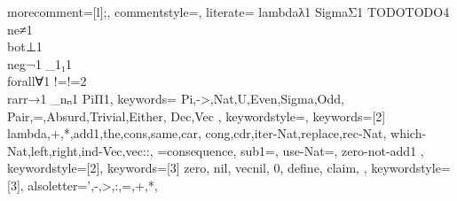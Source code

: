 
\makeatletter
\newenvironment{CenteredBox}{%
\begin{Sbox}}{%
\end{Sbox}\centerline{\parbox{\wd\@Sbox}{\TheSbox}}}%
\makeatother


\newcommand\blue{\color[HTML]{3eabc9}}
\newcommand\lime{\color[HTML]{20b027}}

 {
	morecomment=[l]{;},
	commentstyle={\color[HTML]{7f7f7f}\slshape},
    literate=%
        {lambda}{{\color[HTML]{20b027}λ}}1
        {Sigma}{{\color[HTML]{3eabc9}Σ}}1
        {TODO}{{\color[HTML]{ff0000}TODO}}4
        {\\ne}{≠}1
        {\\bot}{⊥}1
        {\\neg}{¬}1
        {_1}{₁}1
        {\\forall}{∀}1
        {!=}{!=}2
        {\\rarr}{→}1
        {_n}{ₙ}1
        {Pi}{{\color[HTML]{3eabc9}Π}}1,
	keywords={
        Pi,->,Nat,U,Even,Sigma,Odd,
        Pair,=,Absurd,Trivial,Either,
        Dec,Vec
    },
    keywordstyle=\blue,
	keywords={[2]
        lambda,+,*,add1,the,cons,same,car,
        cong,cdr,iter-Nat,replace,rec-Nat,
        which-Nat,left,right,ind-Vec,vec::,
        =consequence, sub1=, use-Nat=, zero-not-add1
    },
    keywordstyle={[2]\lime},
    keywords={[3]
        zero, nil, vecnil, 0, define, claim,
    },
    keywordstyle={[3]\color[HTML]{0000ff}},
	alsoletter={',-,>,:,=,+,*},
}
